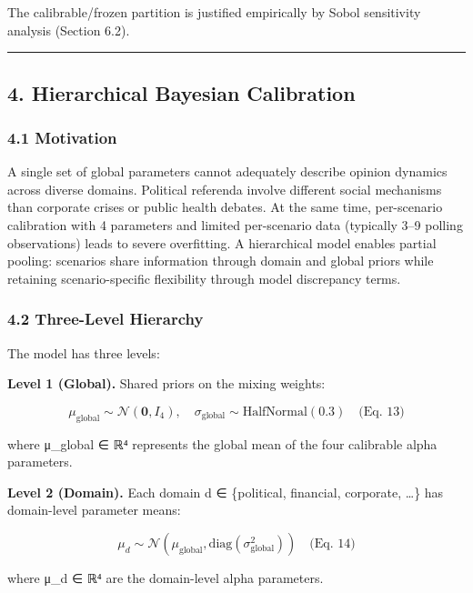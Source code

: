 \documentclass[
]{article}
\begin{document}
The calibrable/frozen partition is justified empirically by Sobol
sensitivity analysis (Section 6.2).

\begin{center}\rule{0.5\linewidth}{0.5pt}\end{center}

\subsection{4. Hierarchical Bayesian
Calibration}\label{hierarchical-bayesian-calibration}

\subsubsection{4.1 Motivation}\label{motivation}

A single set of global parameters cannot adequately describe opinion
dynamics across diverse domains. Political referenda involve different
social mechanisms than corporate crises or public health debates. At the
same time, per-scenario calibration with 4 parameters and limited
per-scenario data (typically 3--9 polling observations) leads to severe
overfitting. A hierarchical model enables partial pooling: scenarios
share information through domain and global priors while retaining
scenario-specific flexibility through model discrepancy terms.

\subsubsection{4.2 Three-Level Hierarchy}\label{three-level-hierarchy}

The model has three levels:

\textbf{Level 1 (Global).} Shared priors on the mixing weights:

\[\mu_{\text{global}} \sim \mathcal{N}(\mathbf{0}, I_4), \quad \sigma_{\text{global}} \sim \text{HalfNormal}(0.3) \quad \text{(Eq. 13)}\]

where μ\_global ∈ ℝ⁴ represents the global mean of the four calibrable
alpha parameters.

\textbf{Level 2 (Domain).} Each domain d ∈ \{political, financial,
corporate, \ldots\} has domain-level parameter means:

\[\mu_d \sim \mathcal{N}(\mu_{\text{global}}, \text{diag}(\sigma_{\text{global}}^2)) \quad \text{(Eq. 14)}\]

where μ\_d ∈ ℝ⁴ are the domain-level alpha parameters.
\end{document}
